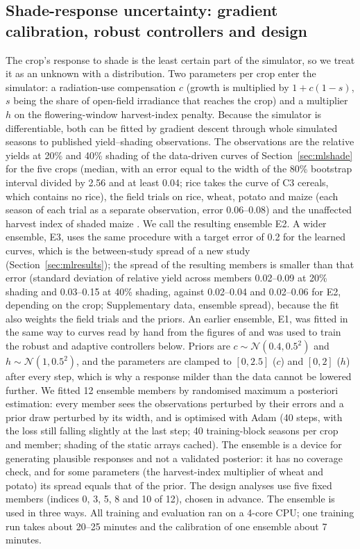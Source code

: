 \subsection{Shade-response uncertainty: gradient calibration, robust controllers and design}\label{sec:uncertainty}
The crop's response to shade is the least certain part of the simulator, so we treat it as an unknown with a distribution. Two parameters per crop enter the simulator: a radiation-use compensation $c$ (growth is multiplied by $1+c(1-s)$, $s$ being the share of open-field irradiance that reaches the crop) and a multiplier $h$ on the flowering-window harvest-index penalty. Because the simulator is differentiable, both can be fitted by gradient descent through whole simulated seasons to published yield--shading observations. The observations are the relative yields at 20\% and 40\% shading of the data-driven curves of Section~\ref{sec:mlshade} for the five crops (median, with an error equal to the width of the 80\% bootstrap interval divided by 2.56 and at least 0.04; rice takes the curve of C3 cereals, which contains no rice), the field trials on rice, wheat, potato and maize \citep{gonocruz2021,weselek2021,ramosfuentes2023} (each season of each trial as a separate observation, error 0.06--0.08) and the unaffected harvest index of shaded maize \citep{ramosfuentes2023}. We call the resulting ensemble E2. A wider ensemble, E3, uses the same procedure with a target error of 0.2 for the learned curves, which is the between-study spread of a new study (Section~\ref{sec:mlresults}); the spread of the resulting members is smaller than that error (standard deviation of relative yield across members 0.02--0.09 at 20\% shading and 0.03--0.15 at 40\% shading, against 0.02--0.04 and 0.02--0.06 for E2, depending on the crop; Supplementary data, ensemble spread), because the fit also weights the field trials and the priors. An earlier ensemble, E1, was fitted in the same way to curves read by hand from the figures of \citet{laub2022} and was used to train the robust and adaptive controllers below. Priors are $c\sim\mathcal N(0.4,0.5^2)$ and $h\sim\mathcal N(1,0.5^2)$, and the parameters are clamped to $[0,2.5]$ ($c$) and $[0,2]$ ($h$) after every step, which is why a response milder than the data cannot be lowered further. We fitted 12 ensemble members by randomised maximum a posteriori estimation: every member sees the observations perturbed by their errors and a prior draw perturbed by its width, and is optimised with Adam (40 steps, with the loss still falling slightly at the last step; 40 training-block seasons per crop and member; shading of the static arrays cached). The ensemble is a device for generating plausible responses and not a validated posterior: it has no coverage check, and for some parameters (the harvest-index multiplier of wheat and potato) its spread equals that of the prior. The design analyses use five fixed members (indices 0, 3, 5, 8 and 10 of 12), chosen in advance. The ensemble is used in three ways. All training and evaluation ran on a 4-core CPU; one training run takes about 20--25 minutes and the calibration of one ensemble about 7 minutes.

